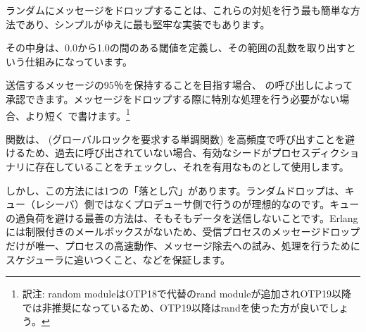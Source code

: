 ランダムにメッセージをドロップすることは、これらの対処を行う最も簡単な方法であり、シンプルがゆえに最も堅牢な実装でもあります。

その中身は、0.0から1.0の間のある閾値を定義し、その範囲の乱数を取り出すという仕組みになっています。


送信するメッセージの95％を保持することを目指す場合、  の呼び出しによって承認できます。メッセージをドロップする際に特別な処理を行う必要がない場合、より短く  で書けます。\footnote{訳注: random moduleはOTP18で代替のrand moduleが追加されOTP19以降では非推奨になっているため、OTP19以降はrandを使った方が良いでしょう。}

関数は、 (グローバルロックを要求する単調関数) を高頻度で呼び出すことを避けるため、過去に呼び出されていない場合、有効なシードがプロセスディクショナリに存在していることをチェックし、それを有用なものとして使用します。

しかし、この方法には1つの「落とし穴」があります。ランダムドロップは、キュー（レシーバ）側ではなくプロデューサ側で行うのが理想的なのです。キューの過負荷を避ける最善の方法は、そもそもデータを送信しないことです。Erlangには制限付きのメールボックスがないため、受信プロセスのメッセージドロップだけが唯一、プロセスの高速動作、メッセージ除去への試み、処理を行うためにスケジューラに追いつくこと、などを保証します。

